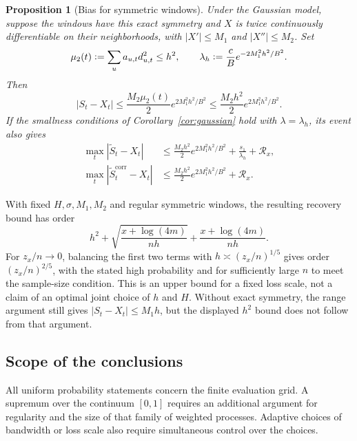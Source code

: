 \documentclass[11pt]{article}
\newcommand{\eqdef}{\mathrel{\vcentcolon=}}
\newtheorem{proposition}{Proposition}[section]
\begin{document}
\begin{proposition}[Bias for symmetric windows]\label{prop:bias}
Under the Gaussian model, suppose the windows have this exact symmetry and
\(X\) is twice continuously differentiable on their neighborhoods, with
\(|X'|\leq M_1\) and \(|X''|\leq M_2\).  Set
\begin{equation}
  \mu_2(t)\eqdef\sum_u a_{u,t}d_{u,t}^2\leq h^2,\qquad
  \lambda_h\eqdef\frac cB e^{-2M_1^2h^2/B^2}.
  \label{eq:bias-constants}
\end{equation}
Then
\begin{equation}
  |S_t-X_t|
  \leq\frac{M_2\mu_2(t)}2 e^{2M_1^2h^2/B^2}
  \leq\frac{M_2h^2}{2}e^{2M_1^2h^2/B^2}.
  \label{eq:population-bias}
\end{equation}
If the smallness conditions of Corollary~\ref{cor:gaussian} hold with
\(\lambda=\lambda_h\), its event also gives
\begin{align}
  \max_t|\widetilde S_t-X_t|
    &\leq\frac{M_2h^2}{2}e^{2M_1^2h^2/B^2}
            +\frac{s_1}{\lambda_h}+\mathcal R_x,
      \label{eq:signal-recovery}\\
  \max_t|\widetilde S_t^{\mathrm{corr}}-X_t|
    &\leq\frac{M_2h^2}{2}e^{2M_1^2h^2/B^2}+\mathcal R_x.
      \label{eq:corrected-signal-recovery}
\end{align}
\end{proposition}


With fixed \(H,\sigma,M_1,M_2\) and regular symmetric windows, the resulting
recovery bound has order
\[
  h^2+\sqrt{\frac{x+\log(4m)}{nh}}
       +\frac{x+\log(4m)}{nh}.
\]
For \(z_x/n\to0\), balancing the first two terms with
\(h\asymp(z_x/n)^{1/5}\) gives order \((z_x/n)^{2/5}\), with the stated
high probability and for sufficiently large \(n\) to meet the sample-size
condition.  This is an upper bound for a fixed loss scale, not a claim of an
optimal joint choice of \(h\) and \(H\).  Without exact symmetry, the range
argument still gives \(|S_t-X_t|\leq M_1h\), but the displayed \(h^2\) bound
does not follow from that argument.

\subsection{Scope of the conclusions}

All uniform probability statements concern the finite evaluation grid.  A
supremum over the continuum \([0,1]\) requires an additional argument for
regularity and the size of that family of weighted processes.  Adaptive choices
of bandwidth or loss scale also require simultaneous control over the choices.
\end{document}
